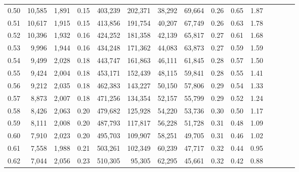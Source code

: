 \begin{tabular}{rrrcrrrrrrrrrrr}
0.50 &  10,585 &  1,891 &                                       0.15 &  403,239 &  202,371 &   38,292 &   69,664 &  0.26 &  0.65 &                         1.87 \\
0.51 &  10,617 &  1,915 &                                       0.15 &  413,856 &  191,754 &   40,207 &   67,749 &  0.26 &  0.63 &                         1.78 \\
0.52 &  10,396 &  1,932 &                                       0.16 &  424,252 &  181,358 &   42,139 &   65,817 &  0.27 &  0.61 &                         1.68 \\
0.53 &   9,996 &  1,944 &                                       0.16 &  434,248 &  171,362 &   44,083 &   63,873 &  0.27 &  0.59 &                         1.59 \\
0.54 &   9,499 &  2,028 &                                       0.18 &  443,747 &  161,863 &   46,111 &   61,845 &  0.28 &  0.57 &                         1.50 \\
0.55 &   9,424 &  2,004 &                                       0.18 &  453,171 &  152,439 &   48,115 &   59,841 &  0.28 &  0.55 &                         1.41 \\
0.56 &   9,212 &  2,035 &                                       0.18 &  462,383 &  143,227 &   50,150 &   57,806 &  0.29 &  0.54 &                         1.33 \\
0.57 &   8,873 &  2,007 &                                       0.18 &  471,256 &  134,354 &   52,157 &   55,799 &  0.29 &  0.52 &                         1.24 \\
0.58 &   8,426 &  2,063 &                                       0.20 &  479,682 &  125,928 &   54,220 &   53,736 &  0.30 &  0.50 &                         1.17 \\
0.59 &   8,111 &  2,008 &                                       0.20 &  487,793 &  117,817 &   56,228 &   51,728 &  0.31 &  0.48 &                         1.09 \\
0.60 &   7,910 &  2,023 &                                       0.20 &  495,703 &  109,907 &   58,251 &   49,705 &  0.31 &  0.46 &                         1.02 \\
0.61 &   7,558 &  1,988 &                                       0.21 &  503,261 &  102,349 &   60,239 &   47,717 &  0.32 &  0.44 &                         0.95 \\
0.62 &   7,044 &  2,056 &                                       0.23 &  510,305 &   95,305 &   62,295 &   45,661 &  0.32 &  0.42 &                         0.88 \\

\end{tabular}
